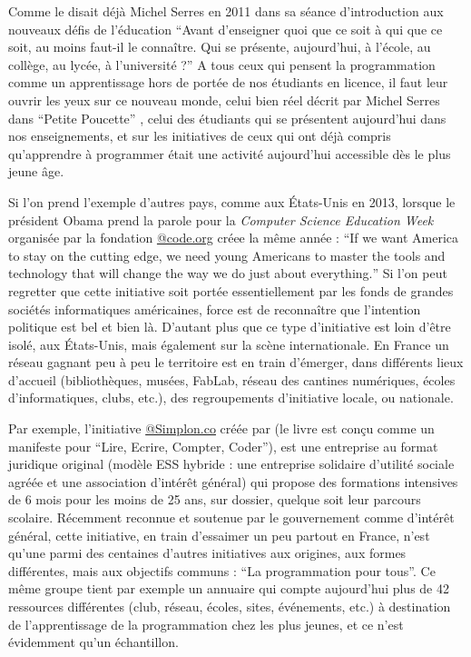 Comme le disait déjà Michel Serres en 2011 dans sa séance d'introduction aux nouveaux défis de l'éducation \enquote{Avant d’enseigner quoi que ce soit à qui que ce soit, au moins faut-il le connaître. Qui se présente, aujourd’hui, à l’école, au collège, au lycée, à l’université ?} \autocite{Serres2011} A tous ceux qui pensent la programmation comme un apprentissage hors de portée de nos étudiants en licence, il faut leur ouvrir les yeux sur ce nouveau monde, celui bien réel décrit par Michel Serres dans \enquote{Petite Poucette} \autocite{Serres2012}, celui des étudiants qui se présentent aujourd'hui dans nos enseignements, et sur les initiatives de ceux qui ont déjà compris qu'apprendre à programmer était une activité aujourd'hui accessible dès le plus jeune âge.

Si l'on prend l'exemple d'autres pays, comme aux États-Unis en 2013, lorsque le président Obama prend la parole pour la \textit{Computer Science Education Week} organisée par la fondation \href{http://code.org}{@code.org} créee la même année : \foreignquote{english}{If we want America to stay on the cutting edge, we need young Americans to master the tools and technology that will change the way we do just about everything.} Si l'on peut regretter que cette initiative soit portée essentiellement par les fonds de grandes sociétés informatiques américaines, force est de reconnaître que l'intention politique est bel et bien là. D'autant plus que ce type d'initiative est loin d'être isolé, aux États-Unis, mais également sur la scène internationale. En France un réseau gagnant peu à peu le territoire est en train d'émerger, dans différents lieux d'accueil (bibliothèques, musées, FabLab, réseau des cantines numériques, écoles d'informatiques, clubs, etc.), des regroupements d'initiative locale, ou nationale.

Par exemple, l'initiative \href{http://Simplon.co}{@Simplon.co}  créée par \textcite{Bardeau2014} (le livre est conçu comme un manifeste pour \enquote{Lire, Ecrire, Compter, Coder}), est une entreprise au format juridique original (modèle ESS hybride : une entreprise solidaire d’utilité sociale agréée et une association d’intérêt général) qui propose des formations intensives de 6 mois pour les moins de 25 ans, sur dossier, quelque soit leur parcours scolaire. Récemment reconnue et soutenue par le gouvernement comme d'intérêt général, cette initiative, en train d'essaimer un peu partout en France, n'est qu'une parmi des centaines d'autres initiatives aux origines, aux formes différentes, mais aux objectifs communs : \enquote{La programmation pour tous}. Ce même groupe tient par exemple un annuaire \autocite{Simplon2015} qui compte aujourd'hui plus de 42 ressources différentes (club, réseau, écoles, sites, événements, etc.) à destination de l'apprentissage de la programmation chez les plus jeunes, et ce n'est évidemment qu'un échantillon.

